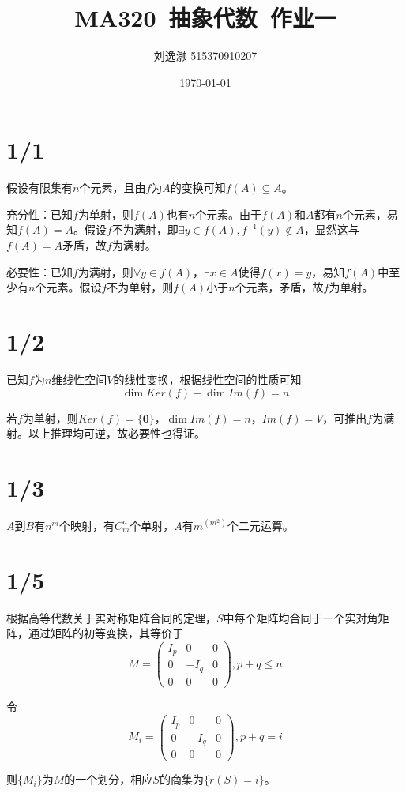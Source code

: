 \documentclass{article}
\title{MA320\ 抽象代数\ 作业一}
\author{刘逸灏 515370910207}
\date{\today}
\begin{document}
\maketitle

\section{1/1}
假设有限集有$n$个元素，且由$f$为$A$的变换可知$f(A)\subseteq A$。

充分性：已知$f$为单射，则$f(A)$也有$n$个元素。由于$f(A)$和$A$都有$n$个元素，易知$f(A)=A$。假设$f$不为满射，即$\exists y\in f(A),f^{-1}(y)\not\in A$，显然这与$f(A)=A$矛盾，故$f$为满射。

必要性：已知$f$为满射，则$\forall y\in f(A)$，$\exists x\in A$使得$f(x)=y$，易知$f(A)$中至少有$n$个元素。假设$f$不为单射，则$f(A)$小于$n$个元素，矛盾，故$f$为单射。

\section{1/2}
已知$f$为$n$维线性空间$V$的线性变换，根据线性空间的性质可知
$$\dim Ker(f)+\dim Im(f)=n$$

若$f$为单射，则$Ker(f)=\{\mathbf{0}\}$，$\dim Im(f)=n$，$Im(f)=V$，可推出$f$为满射。以上推理均可逆，故必要性也得证。

\section{1/3}
$A$到$B$有$n^m$个映射，有$C_m^n$个单射，$A$有$m^{(m^2)}$个二元运算。

\section{1/5}
根据高等代数关于实对称矩阵合同的定理，$S$中每个矩阵均合同于一个实对角矩阵，通过矩阵的初等变换，其等价于
$$
M=\begin{pmatrix}
I_p & 0 & 0 \\
0 & -I_q & 0 \\
0 & 0 & 0
\end{pmatrix},p+q\leqslant n
$$

令
$$M_i=
\begin{pmatrix}
I_p & 0 & 0 \\
0 & -I_q & 0 \\
0 & 0 & 0
\end{pmatrix},p+q=i
$$

则$\{M_i\}$为$M$的一个划分，相应$S$的商集为$\{r(S)=i\}$。
\end{document}
